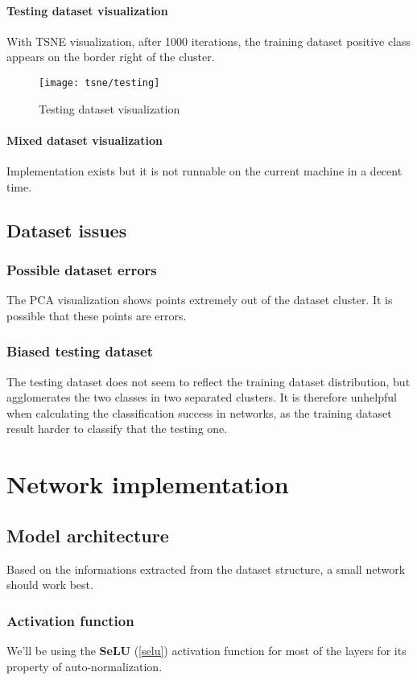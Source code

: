 \subsection{Testing dataset visualization}
With TSNE visualization, after 1000 iterations, the training dataset positive class appears on the border right of the cluster.

\begin{figure}
	\texttt{[image: tsne/testing]}
	\caption{Testing dataset visualization}
\end{figure}

\subsection{Mixed dataset visualization}
Implementation exists but it is not runnable on the current machine in a decent time.

\chapter{Dataset issues}

\section{Possible dataset errors}
The PCA visualization shows points extremely out of the dataset cluster. It is possible that these points are errors.

\section{Biased testing dataset}
The testing dataset does not seem to reflect the training dataset distribution, but agglomerates the two classes in two separated clusters. It is therefore unhelpful when calculating the classification success in networks, as the training dataset result harder to classify that the testing one.

\part{Network implementation}
\chapter{Model architecture}
Based on the informations extracted from the dataset structure, a small network should work best.

\section{Activation function}
We'll be using the \textbf{SeLU} (\ref{selu}) activation function for most of the layers for its property of auto-normalization.

